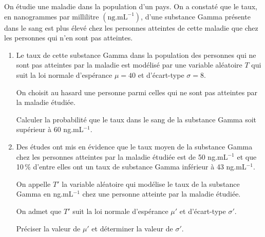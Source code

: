 \documentclass[12pt,frenchb]{article}
\begin{document}
\begin{question}[subtitle={Polynésie septembre 2015}]
On étudie une maladie dans la population d'un pays. On a constaté que le taux, en nanogrammes
par millilitre $\left(\text{ng.mL}^{-1}\right)$, d'une substance Gamma présente dans le sang est plus élevé chez les personnes atteintes de cette maladie que chez les personnes qui n'en sont pas
atteintes.

\medskip

\begin{enumerate}
\item Le taux de cette substance Gamma dans la population des personnes qui ne sont pas
atteintes par la maladie est modélisé par une variable aléatoire $T$ qui suit la loi normale
d'espérance $\mu = 40$ et d'écart-type $\sigma = 8$.

On choisit au hasard une personne parmi celles qui ne sont pas atteintes par la maladie
étudiée.

Calculer la probabilité que le taux dans le sang de la substance Gamma soit supérieur
à 60 ng.mL$^{-1}$.
\item Des études ont mis en évidence que le taux moyen de la substance Gamma chez les
personnes atteintes par la maladie étudiée est de 50 ng.mL$^{-1}$ et que 10\,\% d'entre elles
ont un taux de substance Gamma inférieur à 43 ng.mL$^{-1}$.

On appelle $T'$ la variable aléatoire qui modélise le taux de la substance Gamma en
ng.mL$^{-1}$ chez une personne atteinte par la maladie étudiée.

On admet que $T'$ suit la loi normale d'espérance $\mu'$ et d'écart-type $\sigma'$.

Préciser la valeur de $\mu'$ et déterminer la valeur de $\sigma'$.
\end{enumerate}
\end{question}
\end{document}
